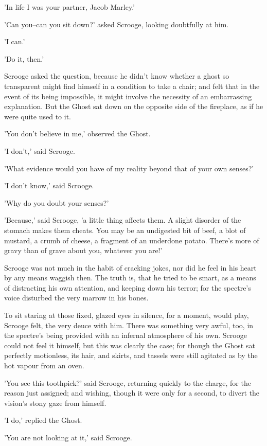 'In life I was your partner, Jacob Marley.'

'Can you--can you sit down?' asked Scrooge, looking doubtfully at him.

'I can.'

'Do it, then.'

Scrooge asked the question, because he didn't know whether a ghost so
transparent might find himself in a condition to take a chair; and felt
that in the event of its being impossible, it might involve the
necessity of an embarrassing explanation. But the Ghost sat down on the
opposite side of the fireplace, as if he were quite used to it.

'You don't believe in me,' observed the Ghost.

'I don't,' said Scrooge.

'What evidence would you have of my reality beyond that of your own
senses?'

'I don't know,' said Scrooge.

'Why do you doubt your senses?'

'Because,' said Scrooge, 'a little thing affects them. A slight disorder
of the stomach makes them cheats. You may be an undigested bit of beef,
a blot of mustard, a crumb of cheese, a fragment of an underdone potato.
There's more of gravy than of grave about you, whatever you are!'

Scrooge was not much in the habit of cracking jokes, nor did he feel in
his heart by any means waggish then. The truth is, that he tried to be
smart, as a means of distracting his own attention, and keeping down his
terror; for the spectre's voice disturbed the very marrow in his bones.

To sit staring at those fixed, glazed eyes in silence, for a moment,
would play, Scrooge felt, the very deuce with him. There was something
very awful, too, in the spectre's being provided with an infernal
atmosphere of his own. Scrooge could not feel it himself, but this was
clearly the case; for though the Ghost sat perfectly motionless, its
hair, and skirts, and tassels were still agitated as by the hot vapour
from an oven.

'You see this toothpick?' said Scrooge, returning quickly to the charge,
for the reason just assigned; and wishing, though it were only for a
second, to divert the vision's stony gaze from himself.

'I do,' replied the Ghost.

'You are not looking at it,' said Scrooge.

